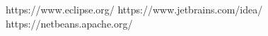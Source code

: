 
\begin{thebibliography}{8}
	 https://www.eclipse.org/
	 https://www.jetbrains.com/idea/
	 https://netbeans.apache.org/
	
	
	
\end{thebibliography}